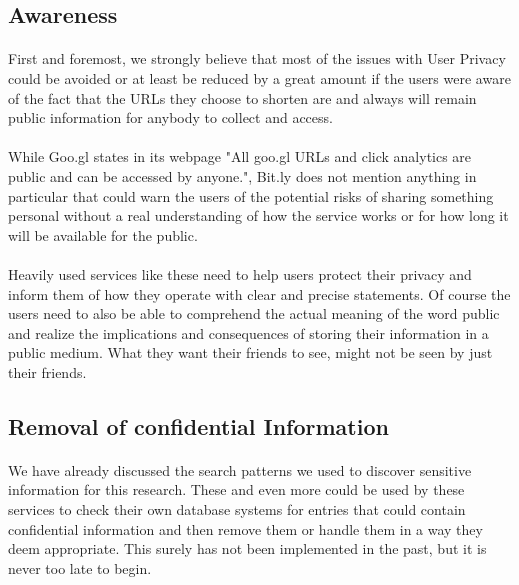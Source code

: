 \documentclass[12pt]{article}
\begin{document}
\subsection{Awareness}

\paragraph{}
 First and foremost, we strongly believe that most of the issues with User Privacy could be avoided or at least be reduced by a great amount if the users were aware of the fact that the URLs they choose to shorten are and always will remain public information for anybody to collect and access.
 
\paragraph{}
 While Goo.gl states in its webpage "All goo.gl URLs and click analytics are public and can be accessed by anyone.", Bit.ly does not mention anything in particular that could warn the users of the potential risks of sharing something personal without a real understanding of how the service works or for how long it will be available for the public.

\paragraph{}
 Heavily used services like these need to help users protect their privacy and inform them of how they operate with clear and precise statements. Of course the users need to also be able to comprehend the actual meaning of the word public and realize the implications and consequences of storing their information in a public medium. What they want their friends to see, might not be seen by just their friends.

\subsection{Removal of confidential Information}

\paragraph{}
 We have already discussed the search patterns we used to discover sensitive information for this research. These and even more could be used by these services to check their own database systems for entries that could contain confidential information and then remove them or handle them in a way they deem appropriate. This surely has not been implemented in the past, but it is never too late to begin.
\end{document}
